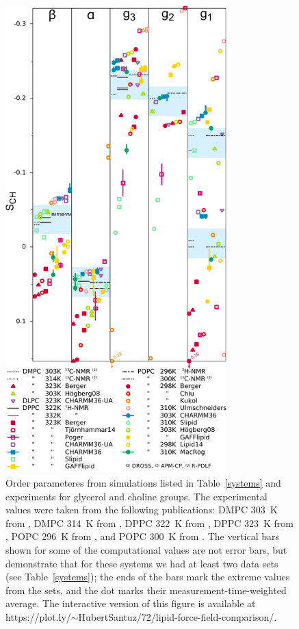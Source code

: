 \documentclass[journal=jacsat,manuscript=article]{achemso}
\begin{document}
\begin{figure}[]
  \includegraphics[width=8.6cm]{../DATAreportediINblog/comparisonSorted.pdf}
\newline
  \caption{\label{HGorderparameters}
  Order parameteres from simulations listed in Table~\ref{systems} and experiments for glycerol and choline groups.
The experimental values were taken from the following publications:
 DMPC 303~K from \cite{gross97},
 DMPC 314~K from \cite{dvinskikh05a},
 DPPC 322~K from \cite{gally75},
 DPPC 323~K from \cite{akutsu81},
 POPC 296~K from \cite{bechinger91}, and
 POPC 300~K from \cite{ferreira13}.
  The vertical bars shown for some of the computational values are not error bars, but demonstrate that for 
these systems we had at least two data sets (see Table~\ref{systems});
the ends of the bars mark the extreme values from the sets, and the dot marks their measurement-time-weighted average. 
The interactive version of this figure is available at  https://plot.ly/$\sim$HubertSantuz/72/lipid-force-field-comparison/.
} 
\end{figure}
\end{document}
